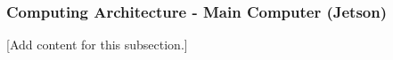 
\subsubsection{Computing Architecture - Main Computer (Jetson)}
\label{subsubsec:design_6_1_computing_architecture_jetson}

[Add content for this subsection.]
